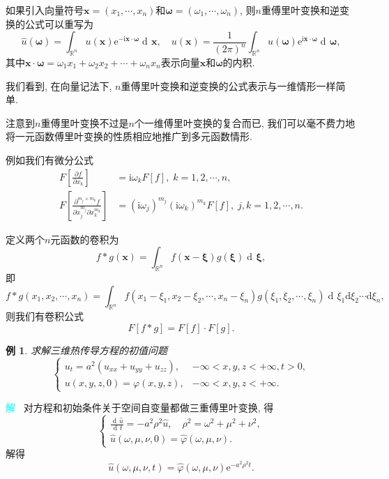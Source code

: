 \documentclass[aspectratio=169,notheorems,12pt,compress,UTF8]{ctexbeamer} %
\DeclareMathOperator\dif{d\!}
\def\R {\mathbb {R}}
\def\dfrac{\displaystyle\frac}
\newcommand{\pp}[2]{\frac{\partial{#1}}{\partial{#2}}}
\newcommand{\me}{\mathrm{e}}
\newcommand{\mi}{\mathrm{i}}
\newcommand{\spb}{\vspace{3mm}}
\newtheorem{example}{例}
\begin{document}
\begin{frame}
如果引入向量符号$\bm{x}=(x_1,\cdots,x_n)$和$\bm{\omega}=(\omega_1,\cdots,\omega_n)$,
则$n$重傅里叶变换和逆变换的公式可以重写为
\begin{equation*}
 \widehat{u}(\bm{\omega})= \int_{\R^n}u(\bm{x})\me^{-\mi \bm{x}\cdot\bm{\omega}}\dif \bm{x},  \quad
  u(\bm{x})= \frac{1}{(2\pi)^n} \int_{\R^n}\widehat{u}(\bm{\omega}) \me^{\mi \bm{x}\cdot\bm{\omega}}\dif \bm{\omega},
\end{equation*}
其中$\bm{x}\cdot\bm{\omega}=\omega_1x_1+\omega_2x_2+\cdots+\omega_nx_n$表示向量$\bm{x}$和$\bm{\omega}$的内积.\spb

我们看到, 在向量记法下, $n$重傅里叶变换和逆变换的公式表示与一维情形一样简单.
\end{frame}

\begin{frame}
注意到$n$重傅里叶变换不过是$n$个一维傅里叶变换的复合而已,
我们可以毫不费力地将一元函数傅里叶变换的性质相应地推广到多元函数情形.\spb

例如我们有微分公式
\begin{align*}
  F\left[\pp{f}{x_k}\right] &=\mi\omega_kF[f],\;k=1,2,\cdots,n,\\
  F\left[\pp{^{m_j+m_k}f}{x_j^{m_j}\partial x_k^{m_k}}\right] &= (\mi\omega_j)^{m_j}(\mi\omega_k)^{m_k}F[f],\;j,k=1,2,\cdots,n.
\end{align*}
\end{frame}

\begin{frame}
定义两个$n$元函数的卷积为
\begin{equation*}
 f\ast g(\bm{x})= \int_{\R^n}f(\bm{x}-\bm{\xi})g(\bm{\xi})\dif\bm{\xi},
\end{equation*}
即
$$
f\ast g(x_1,x_2,\cdots,x_n)=\int_{\R^n}
f(x_1-\xi_1,x_2-\xi_2,\cdots,x_n-\xi_n)g(\xi_1,\xi_2,\cdots,\xi_n)
\dif\xi_1\mathrm{d}\xi_2\cdots \mathrm{d}\xi_n,
$$
则我们有卷积公式
$$
F[f\ast g]=F[f]\cdot F[g].
$$
\end{frame}

\begin{frame}
\begin{example}
求解三维热传导方程的初值问题
$$
\left\{
\begin{array}{ll}
u_{t}=a^2(u_{xx}+u_{yy}+u_{zz}), & -\infty<x,y,z<+\infty,t>0,\\
u(x,y,z,0)=\varphi(x,y,z), & -\infty<x,y,z<+\infty.
\end{array}\right.
$$
\end{example}

\textcolor{cyan}{解~} 对方程和初始条件关于空间自变量都做三重傅里叶变换, 得
$$
\left\{
\begin{array}{ll}
\dfrac{\dif\widehat{u}}{\dif t}=-a^2\rho^2\widehat{u},\quad \rho^2=\omega^2+\mu^2+\nu^2,\\
\widehat{u}(\omega,\mu,\nu,0)=\widehat{\varphi}(\omega,\mu,\nu).
\end{array}\right.
$$
解得
$$
\widehat{u}(\omega,\mu,\nu,t)=\widehat{\varphi}(\omega,\mu,\nu)\me^{-a^2\rho^2t}.
$$
\end{frame}
\end{document}
